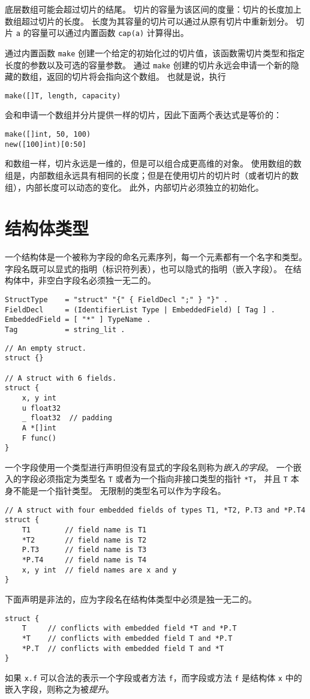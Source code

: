 底层数组可能会超过切片的结尾。
切片的容量为该区间的度量：切片的长度加上数组超过切片的长度。
长度为其容量的切片可以通过从原有切片中重新划分。%
切片 \lstinline|a| 的容量可以通过内置函数 \lstinline|cap(a)| 计算得出。

通过内置函数 \lstinline|make| 创建一个给定的初始化过的切片值，该函数需切片类型和指定长度的参数以及可选的容量参数。
通过 \lstinline|make| 创建的切片永远会申请一个新的隐藏的数组，返回的切片将会指向这个数组。
也就是说，执行
\begin{lstlisting}[style=golang]
make([]T, length, capacity)
\end{lstlisting}
会和申请一个数组并分片提供一样的切片，因此下面两个表达式是等价的：
\begin{lstlisting}
make([]int, 50, 100)
new([100]int)[0:50]
\end{lstlisting}
和数组一样，切片永远是一维的，但是可以组合成更高维的对象。
使用数组的数组是，内部数组永远具有相同的长度；但是在使用切片的切片时（或者切片的数组），内部长度可以动态的变化。
此外，内部切片必须独立的初始化。

\section{结构体类型}\label{sec:struct-type}
一个结构体是一个被称为字段的命名元素序列，每一个元素都有一个名字和类型。
字段名既可以显式的指明（标识符列表），也可以隐式的指明（嵌入字段）。
在结构体中，非空白字段名必须独一无二的。
\begin{lstlisting}[style=EBNF]
StructType    = "struct" "{" { FieldDecl ";" } "}" .
FieldDecl     = (IdentifierList Type | EmbeddedField) [ Tag ] .
EmbeddedField = [ "*" ] TypeName .
Tag           = string_lit .
\end{lstlisting}

\begin{lstlisting}[style=golang]
// An empty struct.
struct {}

// A struct with 6 fields.
struct {
	x, y int
	u float32
	_ float32  // padding
	A *[]int
	F func()
}
\end{lstlisting}
一个字段使用一个类型进行声明但没有显式的字段名则称为\emph{嵌入的字段}。
一个嵌入的字段必须指定为类型名 \lstinline|T| 或者为一个指向非接口类型的指针 \lstinline|*T|，
并且 \lstinline|T| 本身不能是一个指针类型。
无限制的类型名可以作为字段名。
\begin{lstlisting}[style=golang]
// A struct with four embedded fields of types T1, *T2, P.T3 and *P.T4
struct {
	T1        // field name is T1
	*T2       // field name is T2
	P.T3      // field name is T3
	*P.T4     // field name is T4
	x, y int  // field names are x and y
}
\end{lstlisting}
下面声明是非法的，应为字段名在结构体类型中必须是独一无二的。
\begin{lstlisting}[style=golang]
struct {
	T     // conflicts with embedded field *T and *P.T
	*T    // conflicts with embedded field T and *P.T
	*P.T  // conflicts with embedded field T and *T
}
\end{lstlisting}
如果 \lstinline|x.f| 可以合法的表示一个字段或者方法 \lstinline|f|，而字段或方法 \lstinline|f| 是结构体 \lstinline|x| 中的嵌入字段，则称之为被\emph{提升}。

